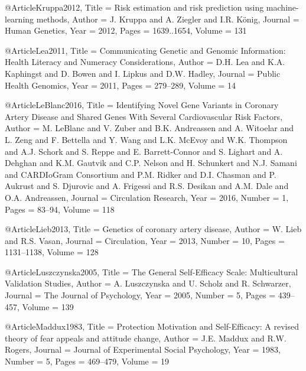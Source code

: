@Article{Kruppa2012,
  Title                    = {Risk estimation and risk prediction using machine-learning methods},
  Author                   = {J. Kruppa and A. Ziegler and I.R. König},
  Journal                  = {Human Genetics},
  Year                     = {2012},
  Pages                    = {1639..1654},
  Volume                   = {131}
}

@Article{Lea2011,
  Title                    = {Communicating Genetic and Genomic Information: Health Literacy and Numeracy Considerations},
  Author                   = {D.H. Lea and K.A. Kaphingst and D. Bowen and I. Lipkus and D.W. Hadley},
  Journal                  = {Public Health Genomics},
  Year                     = {2011},
  Pages                    = {279--289},
  Volume                   = {14}
}

@Article{LeBlanc2016,
  Title                    = {Identifying Novel Gene Variants in Coronary Artery Disease and Shared Genes With Several Cardiovascular Risk Factors},
  Author                   = {M. LeBlanc and V. Zuber and B.K. Andreassen and A. Witoelar and L. Zeng and F. Bettella and Y. Wang and L.K. McEvoy and W.K. Thompson and A.J. Schork and S. Reppe and E. Barrett-Connor and S. Lighart and A. Dehghan and K.M. Gautvik and C.P. Nelson and H. Schunkert and N.J. Samani and {CARDIoGram Consortium} and P.M. Ridker and D.I. Chasman and P. Aukrust and S. Djurovic and A. Frigessi and R.S. Desikan and A.M. Dale and O.A. Andreassen},
  Journal                  = {Circulation Research},
  Year                     = {2016},
  Number                   = {1},
  Pages                    = {83--94},
  Volume                   = {118}
}

@Article{Lieb2013,
  Title                    = {Genetics of coronary artery disease},
  Author                   = {W. Lieb and R.S. Vasan},
  Journal                  = {Circulation},
  Year                     = {2013},
  Number                   = {10},
  Pages                    = {1131--1138},
  Volume                   = {128}
}

@Article{Luszczynska2005,
  Title                    = {The General Self-Efficacy Scale: Multicultural Validation Studies},
  Author                   = {A. Luszczynska and U. Scholz and R. Schwarzer},
  Journal                  = {The Journal of Psychology},
  Year                     = {2005},
  Number                   = {5},
  Pages                    = {439--457},
  Volume                   = {139}
}

@Article{Maddux1983,
  Title                    = {Protection Motivation and Self-Efficacy: A revised theory of fear appeals and attitude change},
  Author                   = {J.E. Maddux and R.W. Rogers},
  Journal                  = {Journal of Experimental Social Psychology},
  Year                     = {1983},
  Number                   = {5},
  Pages                    = {469--479},
  Volume                   = {19}
}

